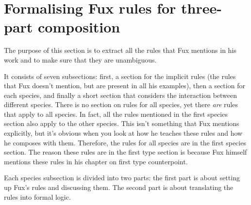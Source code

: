\chapter{Formalising Fux rules for three-part composition}\label{chapter:species}
The purpose of this section is to extract all the rules that Fux mentions in his work and to make sure that they are unambiguous.

It consists of seven subsections: first, a section for the implicit rules (the rules that Fux doesn't mention, but are present in all his examples), then a section for each species, and finally a short section that considers the interaction between different species. There is no section on rules for all species, yet there \textit{are} rules that apply to all species. In fact, all the rules mentioned in the first species section also apply to the other species. This isn't something that Fux mentions explicitly, but it's obvious when you look at how he teaches these rules and how he composes with them. Therefore, the rules for all species are in the first species section. The reason these rules are in the first type section is because Fux himself mentions these rules in his chapter on first type counterpoint.

Each species subsection is divided into two parts: the first part is about setting up Fux's rules and discussing them. The second part is about translating the rules into formal logic.


